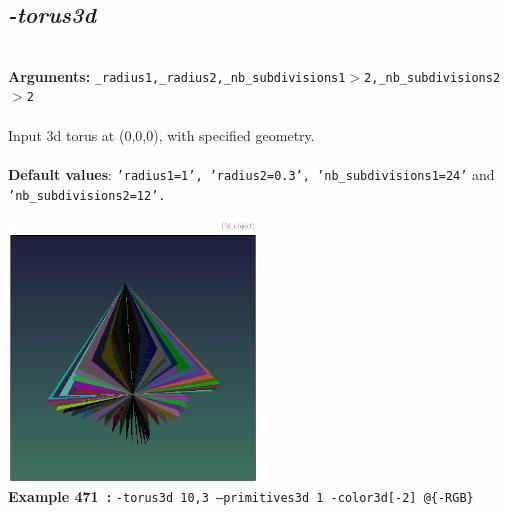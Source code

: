 \documentclass[a4paper,11pt,twoside]{book}
\begin{document}
\subsection{\emph{-torus3d} }\vspace*{-0.5em}
~\\\textbf{Arguments: } 
{\small \texttt{\_radius1,\_radius2,\_nb\_subdivisions1$>$2,\_nb\_subdivisions2$>$2}}\\~\\
Input 3d torus at (0,0,0), with specified geometry.
~\\~\\\textbf{Default values}: {\small \texttt{'radius1=1', 'radius2=0.3', 'nb\_subdivisions1=24'} and \texttt{'nb\_subdivisions2=12'.}}
\begin{center}\includegraphics[keepaspectratio=true,height=7cm,width=\textwidth]{img/gmic_def471.jpg}\\
{\footnotesize \textbf{Example 471~:} \texttt{-torus3d 10,3 --primitives3d 1 -color3d[-2] @\{-RGB\}}}
\end{center}
\end{document}
